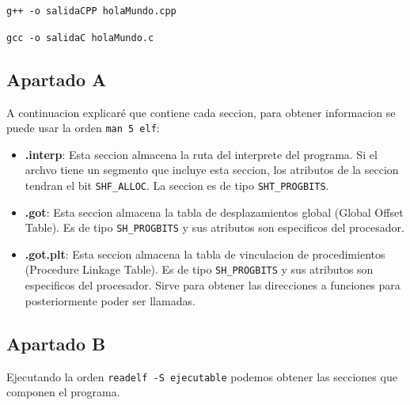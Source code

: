 \documentclass{article}
\begin{document}
\verb|g++ -o salidaCPP holaMundo.cpp|

\verb|gcc -o salidaC holaMundo.c|

\bigskip

\subsection*{Apartado A}
A continuacion explicaré que contiene cada seccion, para obtener informacion se puede usar la orden \verb|man 5 elf|:

\begin{itemize}
    \item \textbf{.interp}: Esta seccion almacena la ruta del interprete del programa. Si el archvo tiene un segmento que incluye esta seccion, los atributos de la seccion tendran el bit \texttt{SHF\_ALLOC}. La seccion es de tipo \texttt{SHT\_PROGBITS}.
    
    \item \textbf{.got}: Esta seccion almacena la tabla de desplazamientos global (Global Offset Table). Es de tipo \texttt{SH\_PROGBITS} y sus atributos son especificos del procesador. 
    
    \item \textbf{.got.plt}: Esta seccion almacena la tabla de vinculacion de procedimientos (Procedure Linkage Table). Es de tipo \texttt{SH\_PROGBITS} y sus atributos son especificos del procesador. Sirve para obtener las direcciones a funciones para posteriormente poder ser llamadas.
\end{itemize}

\newpage

\subsection*{Apartado B}

Ejecutando la orden \verb|readelf -S ejecutable| podemos obtener las secciones que componen el programa.
\end{document}
